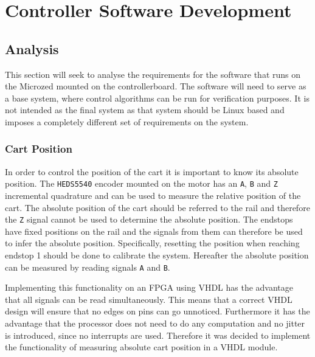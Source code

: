 \section{Controller Software Development} %
\label{sub:controller_board_software}

\subsection{Analysis} %
\label{sub:analysis}
This section will seek to analyse the requirements for the software that runs on the Microzed mounted on the controllerboard.
The software will need to serve as a base system, where control algorithms can be run for verification purposes.
It is not intended as the final system as that system should be Linux based and imposes a completely different set of requirements on the system.

\subsubsection{Cart Position}
\label{ssub:cart_position}
In order to control the position of the cart it is important to know its absolute position.
The \texttt{HEDS5540} \cite{heds5540} encoder mounted on the motor has an \texttt{A}, \texttt{B} and \texttt{Z} incremental quadrature and can be used to measure the relative position of the cart. 
The absolute position of the cart should be referred to the rail and therefore the \texttt{Z} signal cannot be used to determine the absolute position.
The endstops have fixed positions on the rail and the signals from them can therefore be used to infer the absolute position.
Specifically, resetting the position when reaching endstop 1 should be done to calibrate the system.
Hereafter the absolute position can be measured by reading signals \texttt{A} and \texttt{B}.

Implementing this functionality on an FPGA using VHDL has the advantage that all signals can be read simultaneously.
This means that a correct VHDL design will ensure that no edges on pins can go unnoticed.
Furthermore it has the advantage that the processor does not need to do any computation and no jitter is introduced, since no interrupts are used. 
Therefore it was decided to implement the functionality of measuring absolute cart position in a VHDL module.


